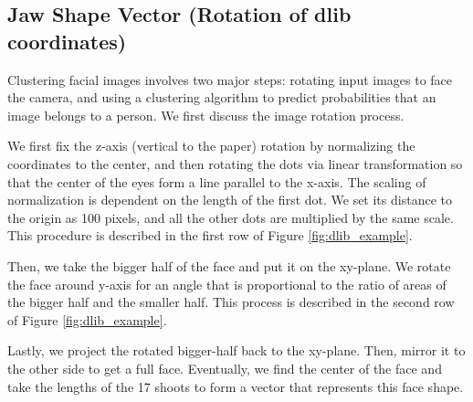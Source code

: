 \documentclass{article}
\begin{document}
\subsection{Jaw Shape Vector (Rotation of dlib coordinates)}
\label{section:dlib_rotation}

Clustering facial images involves two major steps: rotating input images to face
the camera, and using a clustering algorithm to predict probabilities that an
image belongs to a person. We first discuss the image rotation process. 

We first fix the z-axis (vertical to the paper) rotation by normalizing the
coordinates to the center, and then rotating the dots via linear transformation
so that the center of the eyes form a line parallel to the x-axis. The scaling
of normalization is dependent on the length of the first dot. We set its
distance to the origin as 100 pixels, and all the other dots are multiplied by
the same scale. This procedure is described in the first row of Figure
\ref{fig:dlib_example}.

Then, we take the bigger half of the face and put it on the xy-plane. We rotate
the face around y-axis for an angle that is proportional to the ratio of areas
of the bigger half and the smaller half. This process is described in the second
row of Figure \ref{fig:dlib_example}.

Lastly, we project the rotated bigger-half back to the xy-plane. Then, mirror it
to the other side to get a full face. Eventually, we find the center of the face
and take the lengths of the 17 shoots to form a vector that represents this face
shape.
\end{document}
